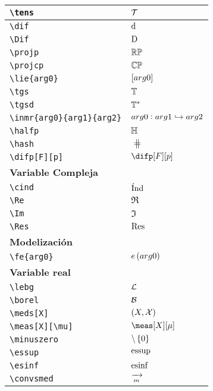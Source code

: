 \begin{longtable}{|p{3.5cm}|p{2cm}|}
\verb|\tens| & $\displaystyle\tens$ \\ \midrule 
\verb|\dif| & $\displaystyle\dif$ \\ \midrule 
\verb|\Dif| & $\displaystyle\Dif$ \\ \midrule 
\verb|\projp| & $\displaystyle\projp$ \\ \midrule 
\verb|\projcp| & $\displaystyle\projcp$ \\ \midrule 
\verb|\lie{arg0}| & $\displaystyle\lie{arg0}$ \\ \midrule 
\verb|\tgs| & $\displaystyle\tgs$ \\ \midrule 
\verb|\tgsd| & $\displaystyle\tgsd$ \\ \midrule 
\verb|\inmr{arg0}{arg1}{arg2}| & $\displaystyle\inmr{arg0}{arg1}{arg2}$ \\ \midrule 
\verb|\halfp| & $\displaystyle\halfp$ \\ \midrule 
\verb|\hash| & $\displaystyle\hash$ \\ \midrule 
\verb|\difp[F][p]| & $\displaystyle\difp[F][p]$ \\ \midrule 
\bottomrule \multicolumn{2}{|p{5.5cm}|}{\textbf{Variable Compleja}} \\ \toprule 
\verb|\cind| & $\displaystyle\cind$ \\ \midrule 
\verb|\Re| & $\displaystyle\Re$ \\ \midrule 
\verb|\Im| & $\displaystyle\Im$ \\ \midrule 
\verb|\Res| & $\displaystyle\Res$ \\ \midrule 
\bottomrule \multicolumn{2}{|p{5.5cm}|}{\textbf{Modelización}} \\ \toprule 
\verb|\fe{arg0}| & $\displaystyle\fe{arg0}$ \\ \midrule 
\bottomrule \multicolumn{2}{|p{5.5cm}|}{\textbf{Variable real}} \\ \toprule 
\verb|\lebg| & $\displaystyle\lebg$ \\ \midrule 
\verb|\borel| & $\displaystyle\borel$ \\ \midrule 
\verb|\meds[X]| & $\displaystyle\meds[X]$ \\ \midrule 
\verb|\meas[X][\mu]| & $\displaystyle\meas[X][\mu]$ \\ \midrule 
\verb|\minuszero| & $\displaystyle\minuszero$ \\ \midrule 
\verb|\essup| & $\displaystyle\essup$ \\ \midrule 
\verb|\esinf| & $\displaystyle\esinf$ \\ \midrule 
\verb|\convsmed| & $\displaystyle\convsmed$ \\ \midrule 

\end{longtable}
